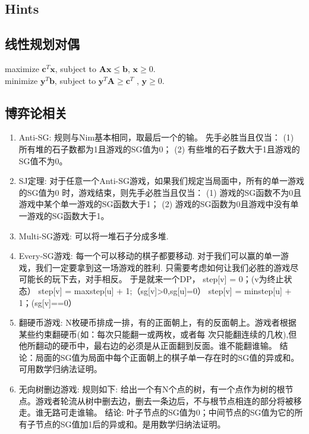 \documentclass[landscape,a4paper]{article}
\begin{document}
\begin{spacing}{0.3}
\begin{multicols}{2}
\begin{lstlisting}
	\end{lstlisting}	
	\end{multicols}

	\begin{multicols}{2}%
	\section{Hints}

	\subsection{线性规划对偶}
	maximize $\bm{c}^T\bm{x}$, subject to $\bm{Ax} \leq \bm{b}$, $\bm{x} \geq 0$.\\
	minimize $\bm{y}^T\bm{b}$, subject to $\bm{y}^T\bm{A} \geq \bm{c}^T$ , $\bm{y} \geq 0$.
	\subsection{博弈论相关}
\begin{enumerate}
	\item Anti-SG:
		规则与Nim基本相同，取最后一个的输。
		先手必胜当且仅当：
		(1) 所有堆的石子数都为1且游戏的SG值为0；
		(2) 有些堆的石子数大于1且游戏的SG值不为0。
	\item SJ定理:
		对于任意一个Anti-SG游戏，如果我们规定当局面中，所有的单一游戏的SG值为0 时，游戏结束，则先手必胜当且仅当：
		(1) 游戏的SG函数不为0且游戏中某个单一游戏的SG函数大于1；
		(2) 游戏的SG函数为0且游戏中没有单一游戏的SG函数大于1。
	\item Multi-SG游戏:
		可以将一堆石子分成多堆.
	\item Every-SG游戏:
		每一个可以移动的棋子都要移动.
		对于我们可以赢的单一游戏，我们一定要拿到这一场游戏的胜利.
		只需要考虑如何让我们必胜的游戏尽可能长的玩下去，对手相反。
		于是就来一个DP，
		step[v] = 0；(v为终止状态）
		step[v] = max{step[u]} + 1;（sg[v]>0,sg[u]=0）
		step[v] = min{step[u]} + 1；(sg[v]==0）
	\item 翻硬币游戏:
		N枚硬币排成一排，有的正面朝上，有的反面朝上。游戏者根据某些约束翻硬币(如：每次只能翻一或两枚，或者每 次只能翻连续的几枚),但他所翻动的硬币中，最右边的必须是从正面翻到反面。谁不能翻谁输。
		结论：局面的SG值为局面中每个正面朝上的棋子单一存在时的SG值的异或和。可用数学归纳法证明。
	\item 无向树删边游戏:
		规则如下:
		给出一个有N个点的树，有一个点作为树的根节点。游戏者轮流从树中删去边，删去一条边后，不与根节点相连的部分将被移走。谁无路可走谁输。
		结论:
		叶子节点的SG值为0；中间节点的SG值为它的所有子节点的SG值加1后的异或和。是用数学归纳法证明。

\end{enumerate}
\end{multicols}
\end{spacing}
\end{document}
